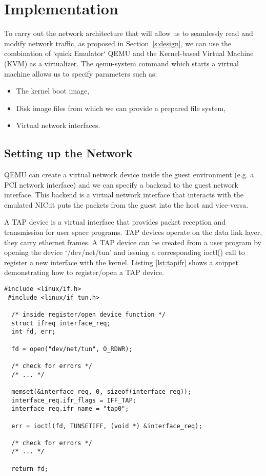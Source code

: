 \section{Implementation}\label{s:implementation} %

To carry out the network architecture that will allow us to seamlessly read and modify
network traffic, as proposed in Section~\ref{s:design}, we can use the combination of
`quick Emulator` QEMU and the Kernel-based Virtual Machine (KVM) as a virtualizer. The qemu-system command which
starts a virtual machine allows us to specify parameters such as:
\begin{itemize}
  \item The kernel boot image,
  \item Disk image files from which we can provide a prepared file system, %
  \item Virtual network interfaces.
\end{itemize}

\subsection{Setting up the Network}

QEMU can create a virtual network device
inside the guest environment (e.g. a PCI network interface) and we can specify a backend to the
guest network interface. This backend is a virtual network interface that interacts with the
emulated NIC:\@ it puts the packets from the guest into the host and vice-versa\cite{DocumentationNetworkingQEMU}.

A TAP device is a virtual interface that provides packet reception and transmission for user space programs.
TAP devices operate on the data link layer, they carry ethernet frames.
A TAP device can be created from a user program by opening the device `/dev/net/tun'  and issuing a
corresponding ioctl() call to register a new interface with the kernel\cite{krasnyanskyUniversalTUNTAP}.
Listing \ref{lst:tapifr} shows a snippet demonstrating how to register/open a TAP device.

\begin{lstlisting}[caption={Registering/opening a virtual TAP interface}, label={lst:tapifr},  style=CStylespecial]
 #include <linux/if.h>
 #include <linux/if_tun.h>

  /* inside register/open device function */
  struct ifreq interface_req;
  int fd, err;

  fd = open("dev/net/tun", O_RDWR);

  /* check for errors */
  /* ... */

  memset(&interface_req, 0, sizeof(interface_req));
  interface_req.ifr_flags = IFF_TAP;
  interface_req.ifr_name = "tap0";

  err = ioctl(fd, TUNSETIFF, (void *) &interface_req);

  /* check for errors */
  /* ... */

  return fd;
\end{lstlisting}

